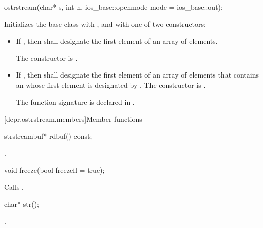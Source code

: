 %
\begin{itemdecl}
ostrstream(char* s, int n, ios_base::openmode mode = ios_base::out);
\end{itemdecl}

\begin{itemdescr}
\pnum
\effects
Initializes the base class with ,
and  with one of two constructors:
\begin{itemize}
\item
If
,
then  shall designate the first element of an array of  elements.

The constructor is
.
\item
If
,
then  shall designate the first element of an array of  elements that
contains an \ntbs{} whose first element is designated by .
%
The constructor is
.
\begin{footnote}
The function signature
%
is declared in .
\end{footnote}
\end{itemize}
\end{itemdescr}

[depr.ostrstream.members]{Member functions}

%
\begin{itemdecl}
strstreambuf* rdbuf() const;
\end{itemdecl}

\begin{itemdescr}
\pnum
\returns
{}.
\end{itemdescr}

%
\begin{itemdecl}
void freeze(bool freezefl = true);
\end{itemdecl}

\begin{itemdescr}
\pnum
\effects
Calls
.
\end{itemdescr}

%
\begin{itemdecl}
char* str();
\end{itemdecl}

\begin{itemdescr}
\pnum
\returns
{}.
\end{itemdescr}

